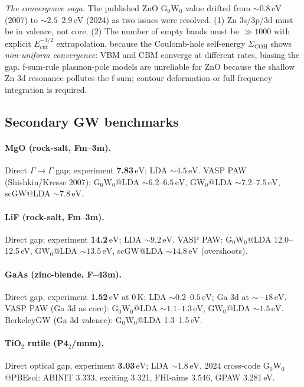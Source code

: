 \documentclass[11pt]{article}
\newcommand{\eV}{\ensuremath{\,\mathrm{eV}}}
\newcommand{\target}[1]{\textbf{\textcolor{blue!60!black}{#1}}}
\begin{document}
\noindent \emph{The convergence saga.}
The published ZnO G$_0$W$_0$ value drifted from $\sim 0.8\eV$ (2007) to
$\sim 2.5$--$2.9\eV$ (2024) as two issues were resolved. (1) Zn 3s/3p/3d
must be in valence, not core. (2) The number of empty bands must be
$\gg 1000$ with explicit $E_{\mathrm{cut}}^{-3/2}$ extrapolation, because
the Coulomb-hole self-energy $\Sigma_{\mathrm{COH}}$ shows
\emph{non-uniform convergence}: VBM and CBM converge at different rates,
biasing the gap. f-sum-rule plasmon-pole models are unreliable for ZnO
because the shallow Zn 3d resonance pollutes the f-sum; contour
deformation or full-frequency integration is required.

\subsection{Secondary GW benchmarks}

\paragraph{MgO (rock-salt, Fm--3m).}
Direct $\Gamma \to \Gamma$ gap; experiment \target{7.83\eV}; LDA $\sim 4.5\eV$.
VASP PAW (Shishkin/Kresse 2007): G$_0$W$_0$@LDA $\sim 6.2$--$6.5\eV$,
GW$_0$@LDA $\sim 7.2$--$7.5\eV$, scGW@LDA $\sim 7.8\eV$.

\paragraph{LiF (rock-salt, Fm--3m).}
Direct gap; experiment \target{14.2\eV}; LDA $\sim 9.2\eV$.
VASP PAW: G$_0$W$_0$@LDA 12.0--12.5\,eV, GW$_0$@LDA $\sim 13.5\eV$,
scGW@LDA $\sim 14.8\eV$ (overshoots).

\paragraph{GaAs (zinc-blende, F--43m).}
Direct gap, experiment \target{1.52\eV} at 0\,K; LDA $\sim 0.2$--$0.5\eV$;
Ga 3d at $\sim -18\eV$. VASP PAW (Ga 3d as core): G$_0$W$_0$@LDA
$\sim 1.1$--$1.3\eV$, GW$_0$@LDA $\sim 1.5\eV$. BerkeleyGW (Ga 3d valence):
G$_0$W$_0$@LDA 1.3--1.5\,eV.

\paragraph{TiO$_2$ rutile (P4$_2$/mnm).}
Direct optical gap, experiment \target{3.03\eV}; LDA $\sim 1.8\eV$.
2024 cross-code G$_0$W$_0$@PBEsol: ABINIT 3.333, exciting 3.321,
FHI-aims 3.546, GPAW 3.281\,eV.
\end{document}
